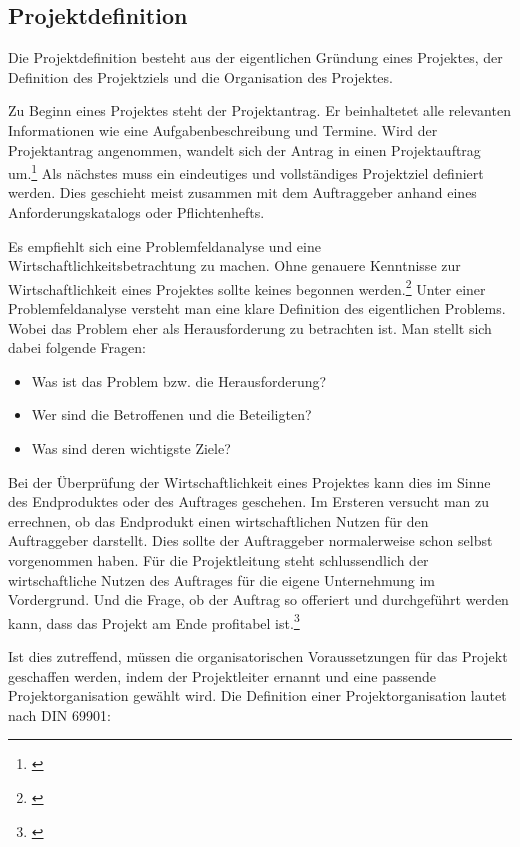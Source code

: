 \subsection{Projektdefinition}
Die Projektdefinition besteht aus der eigentlichen Gründung eines Projektes,
der Definition des Projektziels und die Organisation des Projektes.

Zu Beginn eines Projektes steht der Projektantrag. Er beinhaltetet alle relevanten
Informationen wie eine Aufgabenbeschreibung und Termine. Wird der Projektantrag
angenommen, wandelt sich der Antrag in einen Projektauftrag um.\footnote{\citealp*[Vgl.][S. 13]{burghardt2007einfuehrung}}
Als nächstes muss ein eindeutiges und vollständiges Projektziel definiert werden.
Dies geschieht meist zusammen mit dem Auftraggeber anhand eines Anforderungskatalogs
oder Pflichtenhefts.

Es empfiehlt sich eine Problemfeldanalyse und eine Wirtschaftlichkeitsbetrachtung
zu machen. Ohne genauere Kenntnisse zur Wirtschaftlichkeit eines Projektes sollte
keines begonnen werden.\footnote{\citealp*[Vgl.][S. 45]{burghardt2007einfuehrung}}
Unter einer Problemfeldanalyse versteht man eine klare Definition des eigentlichen
Problems. Wobei das Problem eher als Herausforderung zu betrachten ist. Man
stellt sich dabei folgende Fragen:

\begin{itemize}
    \item Was ist das Problem bzw. die Herausforderung?
    \item Wer sind die Betroffenen und die Beteiligten?
    \item Was sind deren wichtigste Ziele?
\end{itemize}

Bei der Überprüfung der Wirtschaftlichkeit eines Projektes kann dies im Sinne
des Endproduktes oder des Auftrages geschehen. Im Ersteren versucht man zu
errechnen, ob das Endprodukt einen wirtschaftlichen Nutzen für den Auftraggeber
darstellt. Dies sollte der Auftraggeber normalerweise schon selbst vorgenommen
haben. Für die Projektleitung steht schlussendlich der wirtschaftliche Nutzen
des Auftrages für die eigene Unternehmung im Vordergrund. Und die Frage, ob der Auftrag so
offeriert und durchgeführt werden kann, dass das Projekt am Ende profitabel ist.\footnote{\citealp*[Vgl.][S. 4]{prueter2007multi}}

Ist dies zutreffend, müssen die organisatorischen Voraussetzungen für das Projekt geschaffen werden,
indem der Projektleiter ernannt und eine passende Projektorganisation gewählt wird.
Die Definition einer Projektorganisation lautet nach DIN 69901:

